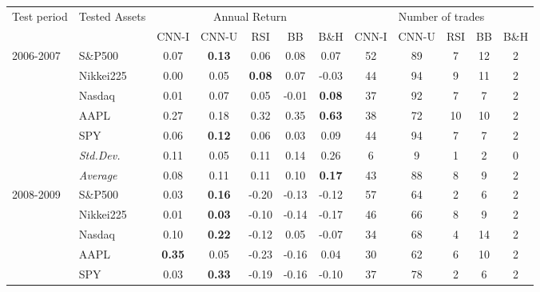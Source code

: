 \documentclass[11pt, a4paper]{article}
\begin{document}
\begin{table}[H]
\begin{tabular}{l|l|ccccc|ccccc}
\multicolumn{1}{m{1cm}|}{\multirow{2}{1cm}{Test period}} & \multicolumn{1}{m{1.5cm}|}{\multirow{2}{1.5cm}{Tested Assets}} &       \multicolumn{5}{c|}{Annual Return} & \multicolumn{5}{c}{Number of trades} \\ \cline{3-12}
  &                  &  CNN-I         & CNN-U         & RSI           & BB            & B\&H          & CNN-I            & CNN-U & RSI & BB & B\&H \\ \hline \hline
\multirow{6}{1cm}{2006-2007} & S\&P500       & 0.07          & \textbf{0.13} & 0.06          & 0.08          & 0.07          & 52               & 89    & 7   & 12 & 2    \\
  & Nikkei225        &  0.00          & 0.05          & \textbf{0.08} & 0.07          & -0.03         & 44               & 94    & 9   & 11 & 2    \\
  & Nasdaq       & 0.01          & 0.07          & 0.05          & -0.01         & \textbf{0.08} & 37               & 92    & 7   & 7  & 2    \\
  & AAPL             & 0.27          & 0.18          & 0.32          & 0.35          & \textbf{0.63} & 38               & 72    & 10  & 10 & 2    \\
  & SPY              & 0.06          & \textbf{0.12} & 0.06          & 0.03          & 0.09          & 44               & 94    & 7   & 7  & 2    \\ 
  \cline{2-12}
  & \textit{Std.Dev.}  & 0.11 & 0.05 & 0.11 & 0.14 & 0.26 & 6 & 9 & 1 & 2 & 0    \\
  \cline{2-12}
  & \textit{Average}  & 0.08          & 0.11          & 0.11          & 0.10          & \textbf{0.17} & 43               & 88    & 8   & 9  & 2    \\ \hline
\multirow{6}{1cm}{2008-2009} & S\&P500           & 0.03 & \textbf{0.16} & -0.20 & -0.13 & -0.12 & 57 & 64 & 2 & 6  & 2 \\
 & Nikkei225         & 0.01 & \textbf{0.03} & -0.10 & -0.14 & -0.17 & 46 & 66 & 8 & 9  & 2 \\
 & Nasdaq            & 0.10 & \textbf{0.22} & -0.12 & 0.05  & -0.07 & 34 & 68 & 4 & 14 & 2 \\
 & AAPL              & \textbf{0.35} & 0.05 & -0.23 & -0.16 & 0.04  & 30 & 62 & 6 & 10 & 2 \\
 & SPY               & 0.03 & \textbf{0.33} & -0.19 & -0.16 & -0.10 & 37 & 78 & 2 & 6  & 2 \\ \cline{2-12} 

\end{tabular}
\end{table}
\end{document}
